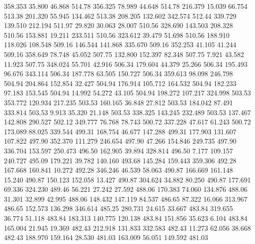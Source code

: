  358.353   35.800   46.868       514.78
 356.325   78.989   44.648       514.78
 216.379   15.039   66.754       513.38
 201.320   55.945  134.462       513.38
 208.205  132.602  342.574       512.44
 339.729  139.510  212.194       511.97
  29.820   30.063   28.007       510.56
 328.690  143.503  208.328       510.56
 153.881   19.211  233.511       510.56
 323.612   39.479   51.698       510.56
 188.910  118.026  108.548       509.16
 146.544  141.868  335.670       509.16
 352.253   41.105   41.244       509.16
 358.649   78.748   45.052       507.75
 132.800  152.397   82.348       507.75
   7.921   43.582   11.923       507.75
 348.024   55.701   42.916       506.34
 179.604   44.379   25.266       506.34
 195.493   96.676  343.114       506.34
 187.778   63.505  150.727       506.34
 359.613   98.098  246.798       504.94
 204.864  152.854   32.427       504.94
 176.914  105.712  164.532       504.94
 182.233   97.183  153.545       504.94
  14.992   54.272   43.105       504.94
 198.272  107.217  324.998       503.53
 353.772  120.934  217.235       503.53
 160.165   36.848   27.812       503.53
 184.042   87.491  333.814       503.53
   9.913   35.320   21.148       503.53
 338.325  143.245  232.489       503.53
 137.467  142.808  290.527       502.12
 349.777   76.768   78.743       500.72
 337.228   47.617   61.243       500.72
 173.089   88.025  339.544       499.31
 168.754   46.677  147.288       499.31
 177.903  131.607  107.822       497.90
 352.370  111.279  246.654       497.90
  47.266  154.846  249.735       497.90
 336.704  153.597  250.473       496.50
 162.905   39.894  328.814       496.50
   7.177  109.157  240.727       495.09
 179.221   39.782  140.160       493.68
 145.284  159.443  359.306       492.28
 167.668  160.841   10.272       492.28
 346.246   46.539   58.063       490.87
 166.669  161.148   15.240       490.87
 150.123  152.058   13.427       490.87
 304.624   34.882   80.250       490.87
 177.691   69.336  324.230       489.46
  56.221   27.242   27.592       488.06
 170.383   74.060  134.876       488.06
  31.301   32.899   42.995       488.06
 148.432  147.119   84.537       486.65
  87.322   16.066  313.967       486.65
 152.573  136.298  346.614       485.25
 280.731   24.615   33.667       483.84
 319.655   36.774   51.118       483.84
 183.313  140.775  120.138       483.84
 151.856   35.623    6.104       483.84
 165.004   21.945   19.369       482.43
 212.918  131.833  332.583       482.43
  11.273   62.056   38.668       482.43
 188.970  159.164   28.530       481.03
 163.009   56.051  149.592       481.03

